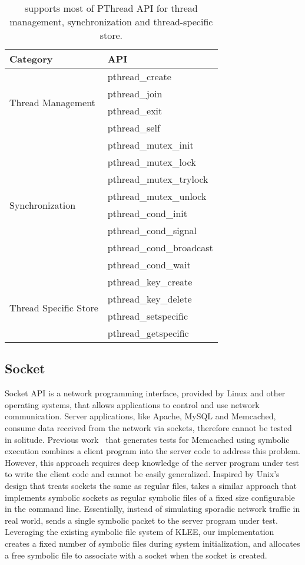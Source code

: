 \begin{table}[tbp]
  \centering
  \caption{\lancet supports most of PThread API for thread management, synchronization and thread-specific store.}
  \label{tab:pthread}
  \begin{tabular}{ll}
    \hline
    {\bf Category} & {\bf API}\\
    \hline
    \multirow{4}{*}{Thread Management} & pthread\_create\\
    & pthread\_join\\
    & pthread\_exit\\
    & pthread\_self\\
    \hline
    \multirow{8}{*}{Synchronization} & pthread\_mutex\_init\\
    & pthread\_mutex\_lock\\
    & pthread\_mutex\_trylock\\
    & pthread\_mutex\_unlock\\
    & pthread\_cond\_init\\
    & pthread\_cond\_signal\\
    & pthread\_cond\_broadcast\\
    & pthread\_cond\_wait\\
    \hline
    \multirow{4}{*}{Thread Specific Store} & pthread\_key\_create\\
    & pthread\_key\_delete\\
    & pthread\_setspecific\\
    & pthread\_getspecific\\
    \hline
  \end{tabular}
\end{table}


\subsection{Socket}
\label{sec:socket}

Socket API is a network programming interface, provided by Linux and other operating systems, that allows applications to control and use network communication.
Server applications, like Apache, MySQL and Memcached, consume data received from the network via sockets, therefore cannot be tested in solitude.
Previous work~\cite{cloud9} that generates tests for Memcached using symbolic execution combines a client program into the server code to address this problem.
However, this approach requires deep knowledge of the server program under test to write the client code and cannot be easily generalized.
Inspired by Unix's design that treats sockets the same as regular files, \lancet takes a similar approach that implements symbolic sockets as regular symbolic files of a fixed size configurable in the command line.
Essentially, instead of simulating sporadic network traffic in real world, \lancet sends a single symbolic packet to the server program under test.
Leveraging the existing symbolic file system of KLEE, our implementation creates a fixed number of symbolic files during system initialization, and allocates a free symbolic file to associate with a socket when the socket is created.


